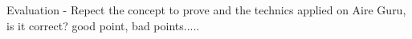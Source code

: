 \subsection*{}
Evaluation - Repect the concept to prove and the technics applied on Aire Guru, is it correct? good point, bad points.....
